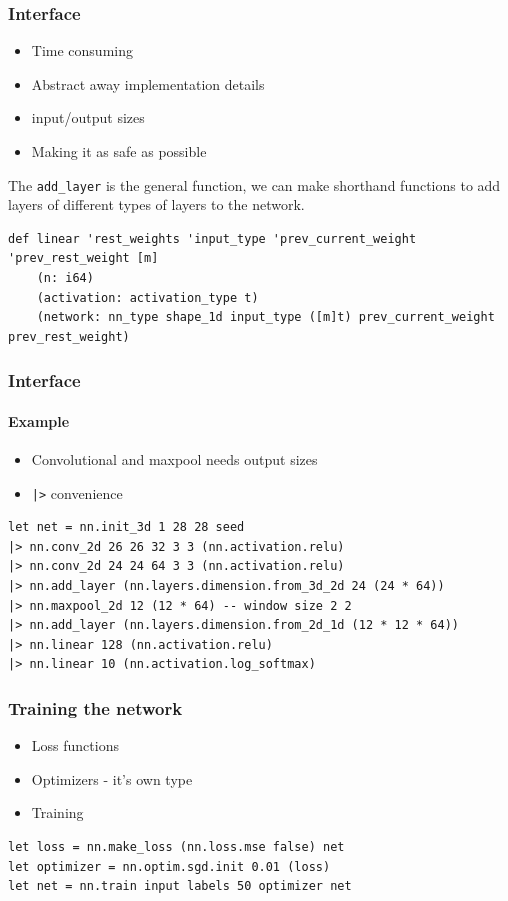 \documentclass{beamer}
\begin{document}
\begin{frame}[fragile]
    \frametitle{Interface}
    
    \begin{itemize}
        \item Time consuming
        \item Abstract away implementation details
        \item input/output sizes
        \item Making it as safe as possible
    \end{itemize}

    The \texttt{add\_layer} is the general function, we can make shorthand functions to add layers of different types of layers to the network.
    \begin{lstlisting}
def linear 'rest_weights 'input_type 'prev_current_weight 'prev_rest_weight [m]
    (n: i64)
    (activation: activation_type t)
    (network: nn_type shape_1d input_type ([m]t) prev_current_weight prev_rest_weight)
    \end{lstlisting}
\end{frame}

\begin{frame}[fragile]
    \frametitle{Interface}
    \framesubtitle{Example}
    
    \begin{itemize}
        \item Convolutional and maxpool needs output sizes
        \item \texttt{|>} convenience
    \end{itemize}
    \begin{lstlisting}[basicstyle=\tiny]
let net = nn.init_3d 1 28 28 seed
|> nn.conv_2d 26 26 32 3 3 (nn.activation.relu)
|> nn.conv_2d 24 24 64 3 3 (nn.activation.relu)
|> nn.add_layer (nn.layers.dimension.from_3d_2d 24 (24 * 64))
|> nn.maxpool_2d 12 (12 * 64) -- window size 2 2
|> nn.add_layer (nn.layers.dimension.from_2d_1d (12 * 12 * 64))
|> nn.linear 128 (nn.activation.relu)
|> nn.linear 10 (nn.activation.log_softmax)
    \end{lstlisting}
\end{frame}

\begin{frame}[fragile]
    \frametitle{Training the network}
    
    \begin{itemize}
        \item Loss functions
        \item Optimizers - it's own type
        \item Training
    \end{itemize}

    \begin{lstlisting}
let loss = nn.make_loss (nn.loss.mse false) net
let optimizer = nn.optim.sgd.init 0.01 (loss)
let net = nn.train input labels 50 optimizer net
    \end{lstlisting}
\end{frame}
\end{document}

